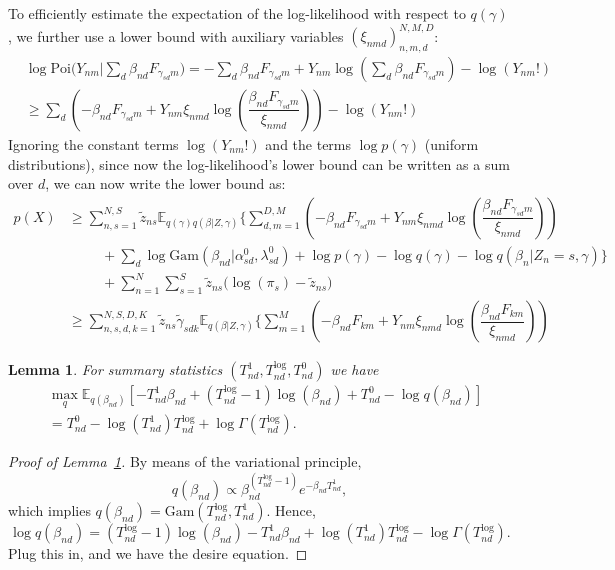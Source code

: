 \documentclass[11pt,twoside]{article}
\newcommand{\Ebb}{\ensuremath{\mathbb{E}}}
\theoremstyle{plain}
\numberwithin{theorem}{section}
\numberwithin{proposition}{section}
\newtheorem{lemma}{Lemma}
\numberwithin{lemma}{section}
\numberwithin{definition}{section}
\numberwithin{condition}{section}
\numberwithin{problem}{section}
\numberwithin{corollary}{section}
\numberwithin{assumption}{section}
\numberwithin{example}{section}
\numberwithin{conjecture}{section}
\theoremstyle{definition}
\numberwithin{remark}{section}
\begin{document}
To efficiently estimate the expectation of the log-likelihood with respect to $q(\gamma)$, we further use a lower bound with auxiliary variables $(\xi_{nmd})_{n, m, d}^{N, M, D}$:
\begin{align}
& \log \mathrm{Poi}\big(Y_{nm}| \sum_{d} \beta_{nd} F_{\gamma_{sd}m} \big)  = - \sum_{d} \beta_{nd} F_{\gamma_{sd}m} + Y_{nm}\log\left(\sum_{d} \beta_{nd} F_{\gamma_{sd}m} \right) - \log (Y_{nm}!) \nonumber\\
&\geq \sum_{d} \left(- \beta_{nd} F_{\gamma_{sd} m} + Y_{nm} \xi_{nmd} \log \left(\dfrac{\beta_{nd} F_{\gamma_{sd}m}}{\xi_{nmd}}\right) \right) - \log (Y_{nm}!)
\end{align}
Ignoring the constant terms $\log (Y_{nm}!)$ and the terms $\log p(\gamma)$ (uniform distributions), since now the log-likelihood's lower bound can be written as a sum over $d$, we can now write the lower bound as:
\begin{align*}
p(X) & \geq \sum_{n, s = 1}^{N, S} \tilde{z}_{ns} \Ebb_{q(\gamma) q(\beta | Z, \gamma)} \bigg\{ \sum_{d, m = 1}^{D, M} \left(- \beta_{nd} F_{\gamma_{sd} m} + Y_{nm} \xi_{nmd} \log \left(\dfrac{\beta_{nd} F_{\gamma_{sd}m}}{\xi_{nmd}}\right) \right)  \\
& \hspace{1cm} + \sum_{d} \log \mathrm{Gam}(\beta_{nd} |\alpha^{0}_{sd}, \lambda^{0}_{sd})  + \log p(\gamma) - \log q(\gamma) - \log q(\beta_n | Z_n = s, \gamma) \bigg\} \\
& \hspace{1cm} + \sum_{n=1}^{N} \sum_{s=1}^{S} \tilde{z}_{ns} \big(\log(\pi_s) - \tilde{z}_{ns} \big)\\
& \geq \sum_{n, s, d, k = 1}^{N, S, D, K} \tilde{z}_{ns} \tilde{\gamma}_{sdk} \Ebb_{q(\beta | Z, \gamma)} \bigg\{ \sum_{m = 1}^{M} \left(- \beta_{nd} F_{k m} + Y_{nm} \xi_{nmd} \log \left(\dfrac{\beta_{nd} F_{km}}{\xi_{nmd}}\right) \right) 
\end{align*}


\begin{lemma}\label{lem:log_evidence}
For summary statistics $(T^{1}_{nd}, T^{\mathrm{log}}_{nd}, T^{0}_{nd})$ we have
\begin{align*}
& \max_{q} \Ebb_{q(\beta_{nd})} \left[ - T^{1}_{nd} \beta_{nd}  + (T^{\mathrm{log}}_{nd} - 1) \log(\beta_{nd}) + T^0_{nd} - \log q(\beta_{nd}) \right] \\
& = T_{nd}^0 - \log(T_{nd}^1) T^{\mathrm{log}}_{nd} + \log \Gamma(T_{nd}^{\mathrm{log}}).
\end{align*}
\end{lemma}
\begin{proof}[Proof of Lemma~\ref{lem:log_evidence}]
By means of the variational principle, 
$$q(\beta_{nd}) \propto \beta_{nd}^{(T^{\mathrm{log}}_{nd} - 1)} e^{- \beta_{nd} T^1_{nd}}, $$
which implies $q(\beta_{nd}) = \mathrm{Gam}(T^{\mathrm{log}}_{nd}, T^{1}_{nd})$. Hence,
\begin{equation}
\log q(\beta_{nd}) = (T^{\mathrm{log}}_{nd} - 1) \log(\beta_{nd}) - T^1_{nd} \beta_{nd} + \log(T_{nd}^{1}) T_{nd}^{\mathrm{log}} - \log \Gamma(T_{nd}^{\mathrm{log}}). 
\end{equation}
Plug this in, and we have the desire equation.
\end{proof}
\end{document}
